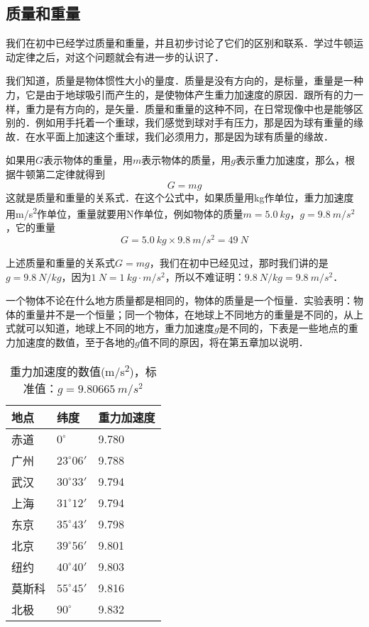 \begin{Test}
\section{质量和重量}
我们在初中已经学过质量和重量，并且初步讨论了它们的区别和联系．学过牛顿运动定律之后，对这个问题就会有进一步的认识了．

我们知道，质量是物体惯性大小的量度．质量是没有方向的，是标量，重量是一种力，它是由于地球吸引而产生的，是使物体产生重力加速度的原因．跟所有的力一样，重力是有方向的，是矢量．质量和重量的这种不同，在日常现像中也是能够区别的．例如用手托着一个重球，我们感觉到球对手有压力，那是因为球有重量的缘故．在水平面上加速这个重球，我们必须用力，那是因为球有质量的缘故．

如果用$G$表示物体的重量，用$m$表示物体的质量，用$g$表示重力加速度，那么，根据牛顿第二定律就得到
\[ G=mg\]
这就是质量和重量的关系式．在这个公式中，如果质量用\si{kg}作单位，重力加速度用\si{m/s^2}作单位，重量就要用\si{N}作单位，例如物体的质量$m=\SI{5.0}{kg}$，$g=\SI{9.8}{m/s^2}$，它的重量
\[G=\SI{5.0}{kg}\times \SI{9.8}{m/s^2}=\SI{49}{N}\]

上述质量和重量的关系式$G=mg$，我们在初中已经见过，那时我们讲的是$g=\SI{9.8}{N/kg}$，因为$\SI{1}{N}=\SI{1}{kg\cdot m/s^2}$，所以不难证明：$\SI{9.8}{N/kg}=\SI{9.8}{m/s^2}$．


一个物体不论在什么地方质量都是相同的，物体的质量是一个恒量．实验表明：物体的重量井不是一个恒量；同一个物体，在地球上不同地方的重量是不同的，从上式就可以知道，地球上不同的地方，重力加速度$g$是不同的，下表是一些地点的重力加速度的数值，至于各地的$g$值不同的原因，将在第五章加以说明．
\begin{table}[H]
    \centering
    \caption{重力加速度的数值(\si{m/s^2})，标准值：$g=\SI{9.80665}{m/s^2}$
    }
    \begin{tabularx}{\textwidth}{MMM}
        \toprule[1.5pt]
        地点  & 纬度             & 重力加速度 \\
        \midrule
        赤道  & $0^\circ$      & 9.780 \\
        广州  & $23^\circ 06'$ & 9.788 \\
        武汉  & $30^\circ 33'$ & 9.794 \\
        上海  & $31^\circ 12'$ & 9.794 \\
        东京  & $35^\circ 43'$ & 9.798 \\
        北京  & $39^\circ 56'$ & 9.801 \\
        纽约  & $40^\circ 40'$ & 9.803 \\
        莫斯科 & $55^\circ 45'$ & 9.816 \\
        北极  & $90^\circ$     & 9.832 \\
        \bottomrule[1.5pt]
    \end{tabularx}
\end{table}


\end{Test}
